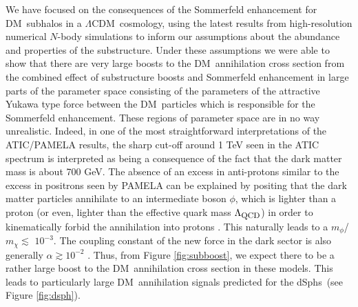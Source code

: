 \documentclass[aps,prd,twocolumn,amsmath,amssymb,floatfix,nofootinbib,10pt]{revtex4}
\newcommand{\CDM}{CDM}
\newcommand{\LCDM}{\ensuremath{\Lambda}\CDM}
\newcommand{\DM}{DM}
\newcommand{\mdm}{\ensuremath{m_{\chi}}}
\newcommand{\mv}{\ensuremath{m_{\phi}}}
\newcommand{\dSphs}{dSphs}
\begin{document}
We have focused on the consequences of the Sommerfeld enhancement for
\DM\ subhalos in a \LCDM\ cosmology, using the latest results from
high-resolution numerical $N$-body simulations to inform our
assumptions about the abundance and properties of the
substructure. Under these assumptions we were able to show that there
are very large boosts to the \DM\ annihilation cross section from the
combined effect of substructure boosts and Sommerfeld enhancement in
large parts of the parameter space consisting of the parameters of the
attractive Yukawa type force between the \DM\ particles which is
responsible for the Sommerfeld enhancement. These regions of parameter
space are in no way unrealistic. Indeed, in one of the most
straightforward interpretations of the ATIC/PAMELA results, the sharp
cut-off around 1 TeV seen in the ATIC spectrum is interpreted as being
a consequence of the fact that the dark matter mass is about 700
GeV. The absence of an excess in anti-protons similar to the excess in
positrons seen by PAMELA can be explained by positing that the dark
matter particles annihilate to an intermediate boson $\phi$, which is
lighter than a proton (or even, lighter than the effective quark mass
$\Lambda_{\mbox{\footnotesize QCD}}$) in order to kinematically forbid
the annihilation into protons \cite{2008arXiv0811.3641C}. This
naturally leads to a \mv/\mdm $\lesssim$ $10^{-3}$. The coupling
constant of the new force in the dark sector is also generally $\alpha
\gtrsim 10^{-2}$ \cite{ArkaniHamed:2008qn,2008arXiv0812.0360L}. Thus,
from Figure \ref{fig:subboost}, we expect there to be a rather large
boost to the \DM\ annihilation cross section in these models. This
leads to particularly large \DM\ annihilation signals predicted for
the \dSphs\ (see Figure \ref{fig:dsph}).
\end{document}
